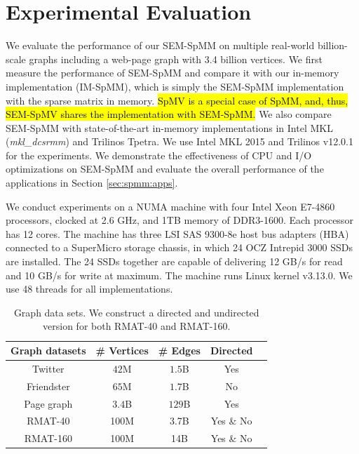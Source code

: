 \section{Experimental Evaluation}

We evaluate the performance of our SEM-SpMM on multiple real-world billion-scale
graphs including a web-page graph with 3.4 billion vertices. We first measure
the performance of SEM-SpMM and compare it with our in-memory implementation
(IM-SpMM), which is simply the SEM-SpMM implementation with the sparse matrix
in memory. \hl{SpMV is a special case of SpMM, and, thus, SEM-SpMV shares
the implementation with SEM-SpMM.}
We also compare SEM-SpMM with state-of-the-art in-memory implementations in
Intel MKL (\textit{mkl\_dcsrmm}) and Trilinos Tpetra. We use Intel MKL 2015
and Trilinos v12.0.1 for the experiments. We demonstrate the effectiveness of
CPU and I/O optimizations on SEM-SpMM and evaluate the overall performance
of the applications in Section \ref{sec:spmm:apps}.

We conduct experiments on a NUMA machine with
four Intel Xeon E7-4860 processors, clocked at 2.6 GHz, and 1TB memory of
DDR3-1600. Each processor has 12 cores. The machine has three LSI SAS 9300-8e
host bus adapters (HBA) connected to a SuperMicro storage chassis, in which
24 OCZ Intrepid 3000 SSDs are installed. The 24 SSDs together are capable of
delivering 12 GB/s for read and 10 GB/s for write at maximum. The machine runs
Linux kernel v3.13.0. We use 48 threads for all implementations.

\begin{table}
\begin{center}
\footnotesize
\begin{tabular}{|c|c|c|c|c|}
\hline
Graph datasets & \# Vertices & \# Edges & Directed \\
\hline
Twitter \cite{twitter} & $42$M & $1.5$B & Yes \\
\hline
Friendster \cite{friendster} & $65$M & $1.7$B & No \\
\hline
Page graph \cite{web_graph} & $3.4$B & $129$B & Yes \\
\hline
RMAT-40 \cite{rmat} & 100M & 3.7B & Yes \& No \\
\hline
RMAT-160 \cite{rmat} & 100M & 14B & Yes \& No \\
\hline
\end{tabular}
\normalsize
\end{center}
\caption{Graph data sets. We construct a directed and undirected version for
both RMAT-40 and RMAT-160.}
\label{graphs}
\end{table}

